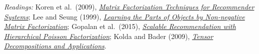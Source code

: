 \documentclass[12pt]{article}
\begin{document}
\vspace{0.05in}
{\footnotesize
\textit{Readings:} Koren et al.\ (2009), \href{https://www.cs.columbia.edu/~blei/fogm/readings/KorenBellVolinsky2009.pdf}{\emph{Matrix Factorization Techniques for Recommender Systems}};
Lee and Seung (1999), \href{https://www.cs.cmu.edu/~efros/courses/LBMV07/Papers/lee-nature-99.pdf}{\emph{Learning the Parts of Objects by Non-negative Matrix Factorization}};
Gopalan et al.\ (2015), \href{https://www.cs.columbia.edu/~blei/papers/GopalanHofmanBlei2015.pdf}{\emph{Scalable Recommendation with Hierarchical Poisson Factorization}};
Kolda and Bader (2009), \href{https://www.cs.columbia.edu/~blei/fogm/readings/KoldaBader2009.pdf}{\emph{Tensor Decompositions and Applications}}.
\par}
\end{document}
